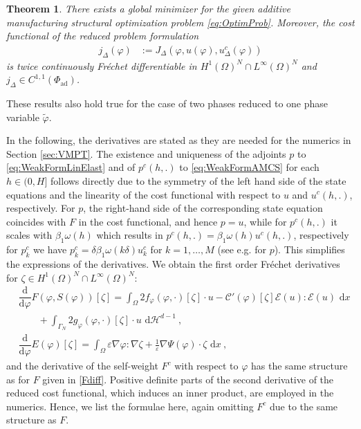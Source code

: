 \documentclass[a4paper,11pt]{article}
\newtheorem{theorem}{Theorem}%
\theoremstyle{remark}
\newcommand{\dx}{\text{ d}x}
\newcommand{\dH}{\text{ d}\mathcal{H}^{d-1}}
\newcommand{\intO}{\int_{\Omega}}
\newcommand{\intG}{\int_{\Gamma_{N}}}
\newcommand{\dphi}{\dfrac{\text{d}}{\text{d}\varphi}}
\newcommand{\Pad}{\Phi_{\text{ad}}}
\newcommand{\HON}{H^1(\Omega)^N }
\newcommand{\LinfN}{L^\infty(\Omega)^N}
\begin{document}
\begin{theorem}
  \label{Analysis}
There exists a global minimizer for the given additive manufacturing structural optimization problem \eqref{eq:OptimProb}.
Moreover, the cost functional of the reduced problem formulation
\begin{align}
\label{eq:RedCostFunc}
j_\Delta(\varphi) &:= J_\Delta(\varphi, u(\varphi), u^c_\Delta(\varphi )) 
\end{align}
is twice continuously  Fr\'echet differentiable in $\HON \cap \LinfN $ and $j_\Delta \in C^{1,1}(\Pad) $.
\end{theorem}
These results also hold true for the case of two phases reduced to one phase variable $\tilde \varphi $. 

In the following, the derivatives are stated
as they are needed for the numerics in Section \ref{sec:VMPT}.
The existence and uniqueness of the adjoints $p$ to \eqref{eq:WeakFormLinElast} and of $p^c(h,.)$ to \eqref{eq:WeakFormAMCS} for each $h\in (0,H]$ follows directly due to the symmetry of the left hand side of the state equations and the linearity of the cost functional with respect to $u$ and $u^c(h,.)$, respectively.
For $p$, the right-hand side of the corresponding state equation coincides with $F$
in the cost functional,
and hence $p=u$, while for $p^c(h,.)$ it scales with $\beta_1 \omega(h)$ which results in $p^c(h,.)= \beta_1 \omega(h) u^c(h,.)$, respectively for $p^c_k$ we have $p^c_k= \delta \beta_1\omega(k\delta ) u^c_k$ for $k=1,\ldots ,M$
(see e.g. \cite{BFGS14,DissRupprecht}
  for $p$).
This simplifies the expressions of the derivatives. We obtain the first order Fréchet derivatives for $\zeta\in\HON\cap\LinfN$:
\begin{align}
&\dphi F(\varphi,S(\varphi))[\zeta] 
 =
 \intO 2 f_\varphi (\varphi,\cdot)[\zeta] \cdot u - \mathcal{C}'(\varphi)[\zeta]\mathcal{E}(u):\mathcal{E}(u) \dx
 \label{Fdiff}\\
& \qquad  + \intG 2 g_\varphi(\varphi,\cdot)[\zeta] \cdot u\dH \ ,
\nonumber\\
&\dphi E(\varphi)[\zeta]  =
\intO \varepsilon \nabla\varphi:\nabla\zeta + \tfrac{1}{\varepsilon} \nabla \Psi(\varphi) \cdot \zeta\dx \ ,
\label{Ediff}
\end{align}
%
and the derivative of the self-weight $F^c$ with respect to $\varphi $ has the same structure as for $F$ given in \eqref{Fdiff}. 
Positive definite parts of the second derivative of the reduced cost functional, which induces an inner product, are employed in the numerics. 
Hence, we list the formulae here, again omitting $F^c$ due to the same structure as $F$.
\end{document}
